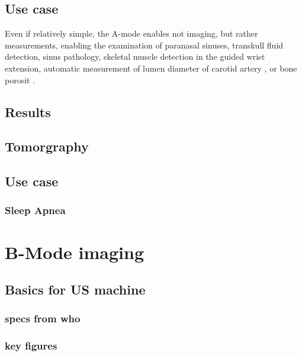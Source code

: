 \documentclass[conference]{IEEEtran}
\begin{document}
\subsection{Use case}


Even if relatively simple, the A-mode enables not imaging, but rather measurements, enabling the examination of paranasal sinuses, transkull fluid detection, sinus pathology, skeletal muscle detection in the guided wrist extension, automatic measurement of lumen diameter of carotid artery \cite{li_new_2014}, or bone porosit \cite{wahab_design_2016}.



\subsection{Results}





\subsection{Tomorgraphy}

\cite{kuzmin_fast_2016}

\subsection{Use case}

\subsubsection{Sleep Apnea}

\cite{weng_fpga-based_2015}

\section{B-Mode imaging}

\subsection{Basics for US machine}

\subsubsection{specs from who}



\subsubsection{key figures}
\end{document}
